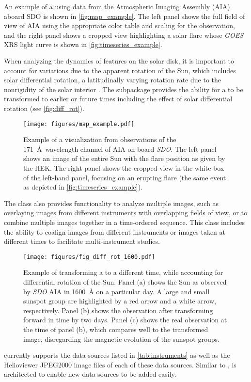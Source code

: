 An example of a \Map using data from the Atmospheric Imaging Assembly (AIA) aboard SDO is shown in \autoref{fig:map_example}.
The left panel shows the full field of view of AIA using the appropriate color table and scaling for the observation, and the right panel shows a cropped view highlighting a solar flare whose \textit{GOES} XRS light curve is shown in \autoref{fig:timeseries_example}.

When analyzing the dynamics of features on the solar disk, it is important to account for variations due to the apparent rotation of the Sun, which includes solar differential rotation, a latitudinally varying rotation rate due to the nonrigidity of the solar interior \citep[see][]{Beck2000}.
The  subpackage provides the ability for a \Map to be transformed to earlier or future times including the effect of solar differential rotation (see \autoref{fig:diff_rot}).

\begin{figure}
    \centering
    \texttt{[image: figures/map\_example.pdf]}
    \caption{Example of a \Map visualization from observations of the 171~\AA\ wavelength channel of AIA on board \textit{SDO}.
    The left panel shows an image of the entire Sun with the flare position as given by the HEK. The right panel shows the cropped view in the white box of the left-hand panel, focusing on an erupting flare (the same event as depicted in \autoref{fig:timeseries_example}).}
    \label{fig:map_example}
\end{figure}

The \Map class also provides functionality to analyze multiple images, such as overlaying images from different instruments with overlapping fields of view, or to combine multiple images together in a time-ordered sequence.
This class includes the ability to coalign images from different instruments or images taken at different times to facilitate multi-instrument studies.


\begin{figure}
    \center
    \texttt{[image: figures/fig\_diff\_rot\_1600.pdf]}
    \caption{Example of transforming a \Map to a different time, while accounting for differential rotation of the Sun.
    Panel (a) shows the Sun as observed by \textit{SDO} AIA in 1600~\AA{} on a particular day.
    A large and small sunspot group are highlighted by a red arrow and a white arrow, respectively.
    Panel (b) shows the observation after transforming forward in time by two days.
    Panel (c) shows the real observation at the time of panel (b), which compares well to the transformed image, disregarding the magnetic evolution of the sunspot groups.}
    \label{fig:diff_rot}
\end{figure}

\Map currently supports the data sources listed in \autoref{tab:instruments} as well as the Helioviewer JPEG2000 image files of  each of these data sources.
Similar to \Timeseries, \Map is architected to enable new data sources to be added easily.
